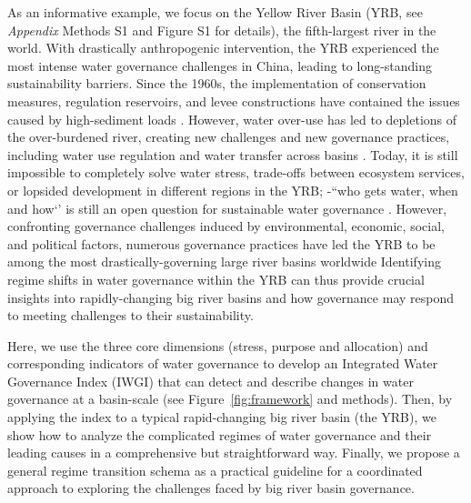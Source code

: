 As an informative example, we focus on the Yellow River Basin (YRB, see \textit{Appendix} Methods S1 and Figure S1 for details), the fifth-largest river in the world.
With drastically anthropogenic intervention, the YRB experienced the most intense water governance challenges in China, leading to long-standing sustainability barriers.
Since the 1960s, the implementation of conservation measures, regulation reservoirs, and levee constructions have contained the issues caused by high-sediment loads
\cite{wangReducedsedimenttransport2016,wuEvolutioneffectssocialecological2020}.
However, water over-use has led to depletions of the over-burdened river, creating new challenges and new governance practices, including water use regulation and water transfer across basins
\cite{xiaDevelopmentWaterAllocation2012}.
Today, it is still impossible to completely solve water stress, trade-offs between ecosystem services, or lopsided development in different regions in the YRB; -``who gets water, when and how‘’ is still an open question for sustainable water governance
\cite{wangYellowRiverwater2019,wohlfartSocialecologicalchallengesYellow2016}.
However, confronting governance challenges induced by environmental, economic, social, and political factors, numerous governance practices have led the YRB to be among the most drastically-governing large river basins worldwide
Identifying regime shifts in water governance within the YRB can thus provide crucial insights into rapidly-changing big river basins and how governance may respond to meeting challenges to their sustainability.

Here, we use the three core dimensions (stress, purpose and allocation) and corresponding indicators of water governance to develop an Integrated Water Governance Index (IWGI) that can detect and describe changes in water governance at a basin-scale (see Figure~\ref{fig:framework} and methods).
Then, by applying the index to a typical rapid-changing big river basin (the YRB), we show how to analyze the complicated regimes of water governance and their leading causes in a comprehensive but straightforward way.
Finally, we propose a general regime transition schema as a practical guideline for a coordinated approach to exploring the challenges faced by big river basin governance.

